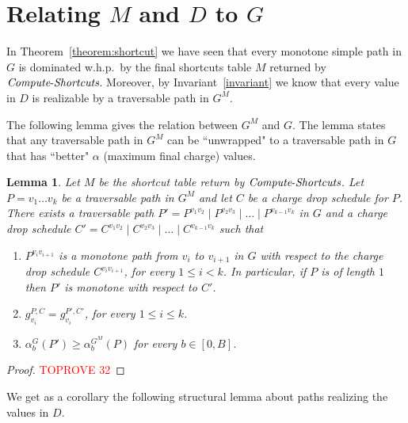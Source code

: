 \documentclass[11pt]{article}
\newtheorem{lemma}[theorem]{Lemma}
\newcommand{\ComputeS}{\mbox{{\it Compute}-{\it Shortcuts}}}
\begin{document}
\section{Relating \texorpdfstring{$M$ and $D$}{M and D} to \texorpdfstring{$G$}{G}}\label{S-relating}
In Theorem~\ref{theorem:shortcut} we have seen that every monotone simple path in $G$ is dominated w.h.p.\ by the final shortcuts table $M$ returned by $\ComputeS$. Moreover, by Invariant~\ref{invariant} we know that every value in $D$ is realizable by a traversable path in $G^M$.

The following lemma gives the relation between $G^M$ and $G$. 
The lemma states that any traversable path in $G^M$ can be ``unwrapped" to a traversable path in $G$ that has ``better" $\alpha$ (maximum final charge) values.

\begin{lemma}\label{lem:GM_to_G}
    Let $M$ be the shortcut table return by $\ComputeS$. Let $P= v_1\ldots v_k$ be a traversable path in $G^M$ and let $C$ be a charge drop schedule for $P$. There exists a traversable path $P' = P^{v_1 v_2} \mid P^{v_2 v_3}\mid \ldots \mid P^{v_{k-1}v_k}$ in $G$ and a charge drop schedule $C' = C^{v_1 v_2} \mid C^{v_2 v_3}\mid \ldots \mid C^{v_{k-1}v_k}$ such that

    \begin{enumerate}[label=(\alph*)]
        \item $P^{v_i v_{i+1}}$ is a monotone path from $v_i$ to $v_{i+1}$ in $G$ with respect to the charge drop schedule  $C^{v_i v_{i+1}}$, for every $1\le i<k$. In particular, if $P$ is of length $1$ then $P'$ is monotone with respect to $C'$.
        \item $g^{P,C}_{v_i} = g^{P',C'}_{v_i}$, for every $1\le i\le k$.
        \item  $\alpha^{G}_b(P') \ge \alpha^{G^M}_b(P)$ for every $b\in [0,B]$.
    \end{enumerate}
\end{lemma}

\begin{proof}\textcolor{red}{TOPROVE 32}\end{proof}

We get as a corollary the following structural lemma about paths realizing the values in $D$.
\end{document}
